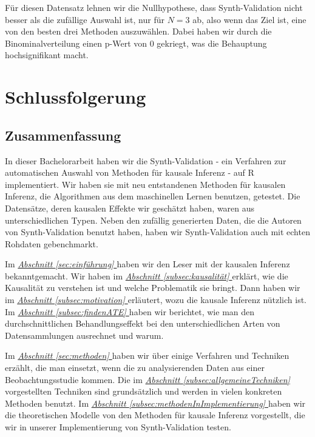 \documentclass[12pt,a4paper,twoside]{scrartcl}
\numberwithin{equation}{section}
\newcommand{\refsec}[1]{\emph{\hyperref[#1]{Abschnitt \ref*{#1} }}}
\begin{document}
\noindent
Für diesen Datensatz lehnen wir die Nullhypothese, dass Synth-Validation nicht besser als die zufällige Auswahl ist, nur für $N=3$ ab, also wenn das Ziel ist, eine von den besten drei Methoden auszuwählen. Dabei haben wir durch die Binominalverteilung einen p-Wert von 0 gekriegt, was die Behauptung hochsignifikant macht.\par

\clearpage

\section{Schlussfolgerung}\label{sec:schlussfolgerung}

\subsection{Zusammenfassung}\label{subsec:zusammenfassung}

In dieser Bachelorarbeit haben wir die Synth-Validation - ein Verfahren zur automatischen Auswahl von Methoden für kausale Inferenz - auf R implementiert. Wir haben sie mit neu entstandenen Methoden für kausalen Inferenz, die Algorithmen aus dem maschinellen Lernen benutzen, getestet. Die Datensätze, deren kausalen Effekte wir geschätzt haben, waren aus unterschiedlichen Typen. Neben den zufällig generierten Daten, die die Autoren von Synth-Validation benutzt haben, haben wir Synth-Validation auch mit echten Rohdaten gebenchmarkt.\par

\noindent
Im \refsec{sec:einführung} haben wir den Leser mit der kausalen Inferenz bekanntgemacht. Wir haben im \refsec{subsec:kausalität} erklärt, wie die Kausalität zu verstehen ist und welche Problematik sie bringt. Dann haben wir im \refsec{subsec:motivation} erläutert, wozu die kausale Inferenz nützlich ist. Im \refsec{subsec:findenATE} haben wir berichtet, wie man den durchschnittlichen Behandlungseffekt bei den unterschiedlichen Arten von Datensammlungen ausrechnet und warum.\par 

\noindent
Im \refsec{sec:methoden} haben wir über einige Verfahren und Techniken erzählt, die man einsetzt, wenn die zu analysierenden Daten aus einer Beobachtungsstudie kommen. Die im \refsec{subsec:allgemeineTechniken} vorgestellten Techniken sind grundsätzlich und werden in vielen konkreten Methoden benutzt. Im \refsec{subsec:methodenInImplementierung} haben wir die theoretischen Modelle von den Methoden für kausale Inferenz vorgestellt, die wir in unserer Implementierung von Synth-Validation testen.\par
\end{document}
